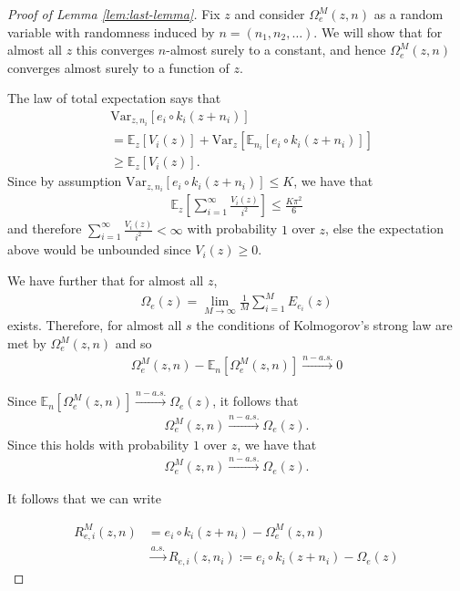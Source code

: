 \begin{proof}[Proof of Lemma \ref{lem:last-lemma}]
Fix ${z}$ and consider $\Omega_{e}^M({z}, {n})$ as a random variable with randomness induced by ${n}=(n_1,n_2,\ldots)$.
We will show that for almost all ${z}$ this converges ${n}$-almost surely to a constant, and hence $\Omega_{e}^M({z}, {n})$ converges almost surely to a function of ${z}$.

The law of total expectation says that
\begin{align*}
&\mathrm{Var}_{{z}, {n}_i} [{e}_i\circ {k}_i({z} + {n}_i)] \\
&= \mathbb{E}_{{z}}\left[ V_i({z}) \right] + \mathrm{Var}_{{z}}\left[ \mathbb{E}_{{n}_i} [{e}_i\circ {k}_i( {z} + {n}_i)] \right] \\
& \geq \mathbb{E}_{{z}}\left[ V_i({z}) \right].
\end{align*}
Since by assumption $\mathrm{Var}_{{z}, {n}_i} [{e}_i\circ {k}_i({z} + {n}_i)] \leq K$, we have that
\begin{align*}
\mathbb{E}_{{z}}\left[ \sum_{i=1}^\infty  \frac{V_i({z})}{i^2} \right] \leq \frac{ K \pi^2}{6}
\end{align*}
and therefore  $\sum_{i=1}^\infty  \frac{V_i({z})}{i^2} < \infty$ with probability $1$ over ${z}$, else the expectation above would be unbounded since $V_i({z})\geq 0$.

We have further that for almost all ${z}$,
\begin{align*}
\Omega_{{e}}({z}) = \lim_{M\to\infty}\frac{1}{M}\sum_{i=1}^M E_{{e}_i}({z})
\end{align*}
exists.
Therefore, for almost all $s$ the conditions of Kolmogorov's strong law are met by $\Omega_{{e}}^M({z}, {n})$ and so
\begin{align*}
\Omega_{{e}}^M({z}, {n}) - \mathbb{E}_{{n}}[\Omega_{{e}}^M({z}, {n})] \overset{{n}-a.s.}{\longrightarrow} 0
\end{align*}

Since $\mathbb{E}_{{n}}[\Omega_{{e}}^M({z}, {n})] \overset{{n}-a.s.}{\longrightarrow} \Omega_{{e}}({z})$, it follows that
\begin{align*}
\Omega_{{e}}^M({z}, {n}) \overset{{n}-a.s.}{\longrightarrow} \Omega_{{e}}({z}).
\end{align*}
Since this holds with probability $1$ over ${z}$, we have that
\begin{align*}
\Omega_{{e}}^M({z}, {n}) \overset{{n}-a.s.}{\longrightarrow} \Omega_{{e}}({z}).
\end{align*}

It follows that we can write

\begin{align*}
R_{{e}, i}^M({z}, {n}) &= {e}_i\circ {k}_i( {z} + {n}_i) - \Omega_{{e}}^M({z}, {n}) \\
&\overset{a.s.}{\longrightarrow} R_{{e}, i}({z}, {n}_i):= {e}_i\circ {k}_i( {z} + {n}_i) - \Omega_{{e}}({z})
\end{align*}
\end{proof}

